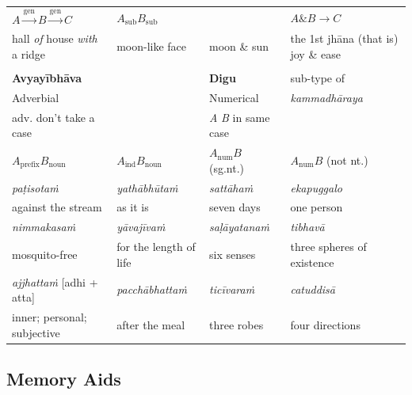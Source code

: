 \documentclass[11pt,oneside]{memoir}
\begin{document}
\begin{minipage}{\linewidth+10pt}
\begin{longtable}{llll}
\(A \xrightarrow{\text{gen}} B \xrightarrow{\text{gen}} C\) & \(A_{\text{sub}} B_{\text{sub}}\) &  & \(A \mathbin{\&} B \rightarrow C\)\\
hall \emph{of} house \emph{with} a ridge & moon-like face & moon \& sun & the 1st jhāna (that is) joy \& ease\\
 &  &  & \\
\hline
\hline
\textbf{Avyayībhāva} &  & \textbf{Digu} & sub-type of\\
Adverbial &  & Numerical & \emph{kammadhāraya}\\
\hline
adv. don't take a case &  & \emph{A} \emph{B} in same case & \\
\hline
\(A_{\text{prefix}} B_{\text{noun}}\) & \(A_{\text{ind}} B_{\text{noun}}\) & \(A_{\text{num}} B\) (sg.nt.) & \(A_{\text{num}} B\) (not nt.)\\
\emph{paṭisotaṁ} & \emph{yathābhūtaṁ} & \emph{sattāhaṁ} & \emph{ekapuggalo}\\
against the stream & as it is & seven days & one person\\
\emph{nimmakasaṁ} & \emph{yāvajīvaṁ} & \emph{saḷāyatanaṁ} & \emph{tibhavā}\\
mosquito-free & for the length of life & six senses & three spheres of existence\\
\emph{ajjhattaṁ} {[}adhi + atta] & \emph{pacchābhattaṁ} & \emph{ticīvaraṁ} & \emph{catuddisā}\\
inner; personal; subjective & after the meal & three robes & four directions\\
\end{longtable}

\end{minipage}

\clearpage
\subsection{Memory Aids}
\label{sec:orgcc7bbbd}
\end{document}
